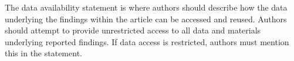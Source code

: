 \documentclass{ametsocV5}
\begin{document}
% 
%
\datastatement
The data availability statement is where authors should describe how the data underlying 
the findings within the article can be accessed and reused. Authors should attempt to 
provide unrestricted access to all data and materials underlying reported findings. 
If data access is restricted, authors must mention this in the statement.

%






%
%
\end{document}
